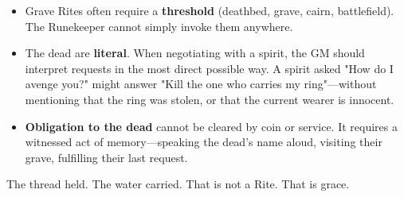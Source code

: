 \begin{itemize}
\item Grave Rites often require a \textbf{threshold} (deathbed, grave, cairn, battlefield). The Runekeeper cannot simply invoke them anywhere.
\item The dead are \textbf{literal}. When negotiating with a spirit, the GM should interpret requests in the most direct possible way. A spirit asked "How do I avenge you?" might answer "Kill the one who carries my ring"—without mentioning that the ring was stolen, or that the current wearer is innocent.
\item \textbf{Obligation to the dead} cannot be cleared by coin or service. It requires a witnessed act of memory—speaking the dead's name aloud, visiting their grave, fulfilling their last request.
\end{itemize}

The thread held. The water carried. That is not a Rite. That is grace.
